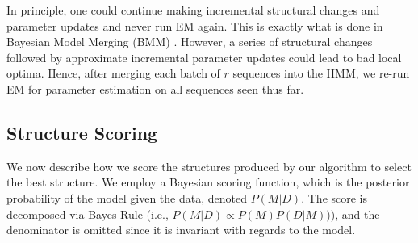 \documentclass[letterpaper]{article}
\begin{document}
In principle, one could continue making incremental structural changes and 
parameter updates and never run EM again. This is exactly 
what is done in 
Bayesian Model Merging (BMM) \cite{stolcke1994best}. 
However, a series of structural changes followed 
by approximate incremental parameter updates could lead to bad 
local optima. Hence, after merging each batch of $r$ sequences into the HMM,  we
re-run EM for parameter estimation on all sequences seen thus far. 









\subsection{Structure Scoring}
\vspace{-.05in}
\label{sec:fb}

We now describe how we score the structures produced by our algorithm to select the best structure. 
We employ a Bayesian scoring function, which is 
the posterior probability of the model given the data, denoted $P(M|D)$.  The score is decomposed via Bayes Rule (i.e., $P(M|D) \propto P(M) P(D|M))$), and the denominator is omitted since it is invariant with regards to the model. 
\end{document}
